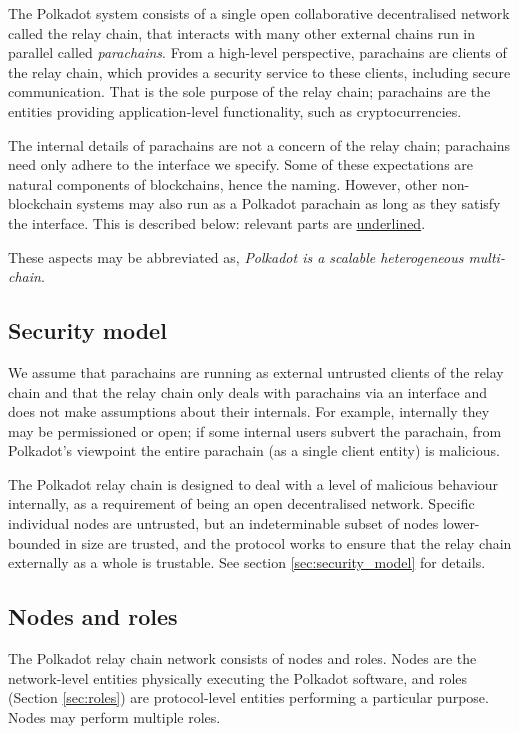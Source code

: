 \documentclass{article}
\begin{document}
The Polkadot system consists of a single open collaborative decentralised network called the relay chain, that interacts with many other external chains run in parallel called \emph{parachains}. From a high-level perspective, parachains are clients of the relay chain, which provides a security service to these clients, including secure communication. That is the sole purpose of the relay chain; parachains are the entities providing application-level functionality, such as cryptocurrencies.

The internal details of parachains are not a concern of the relay chain; parachains need only adhere to the interface we specify. Some of these expectations are natural components of blockchains, hence the naming. However, other non-blockchain systems may also run as a Polkadot parachain as long as they satisfy the interface. This is described below: relevant parts are \uline{underlined}.

These aspects may be abbreviated as, \emph{Polkadot is a scalable heterogeneous multi-chain}.

\subsection{Security model}

We assume that parachains are running as external untrusted clients of the relay chain and that the relay chain only deals with parachains via an interface and does not make assumptions about their internals. For example, internally they may be permissioned or open; if some internal users subvert the parachain, from Polkadot's viewpoint the entire parachain (as a single client entity) is malicious.

The Polkadot relay chain is designed to deal with a level of malicious behaviour internally, as a requirement of being an open decentralised network. Specific individual nodes are untrusted, but an indeterminable subset of nodes lower-bounded in size are trusted, and the protocol works to ensure that the relay chain externally as a whole is trustable. See section \ref{sec:security_model} for details.

\subsection{Nodes and roles}

The Polkadot relay chain network consists of nodes and roles. Nodes are the network-level entities physically executing the Polkadot software, and roles (Section \ref{sec:roles}) are protocol-level entities performing a particular purpose. Nodes may perform multiple roles.
\end{document}
